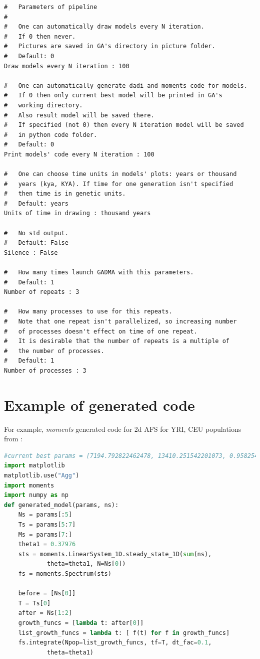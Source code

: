 \documentclass[12pt]{article}
\newcommand{\moments}{\textit{moments}\xspace}
\begin{document}
\begin{appendices}
\begin{lstlisting}
#   Parameters of pipeline
#
#   One can automatically draw models every N iteration. 
#   If 0 then never.
#   Pictures are saved in GA's directory in picture folder.
#   Default: 0
Draw models every N iteration : 100

#   One can automatically generate dadi and moments code for models.
#   If 0 then only current best model will be printed in GA's 
#   working directory.
#   Also result model will be saved there. 
#   If specified (not 0) then every N iteration model will be saved
#   in python code folder.
#   Default: 0
Print models' code every N iteration : 100

#   One can choose time units in models' plots: years or thousand 
#   years (kya, KYA). If time for one generation isn't specified 
#   then time is in genetic units.
#   Default: years
Units of time in drawing : thousand years

#   No std output.
#   Default: False
Silence : False

#   How many times launch GADMA with this parameters.
#   Default: 1
Number of repeats : 3

#   How many processes to use for this repeats.
#   Note that one repeat isn't parallelized, so increasing number
#   of processes doesn't effect on time of one repeat.
#   It is desirable that the number of repeats is a multiple of 
#   the number of processes.
#   Default: 1
Number of processes : 3
\end{lstlisting}

\section{Example of generated code}
\label{sec:ex-gen-code}
For example, \moments generated code for 2d AFS for YRI, CEU populations from \cite{gutenkunst2009}:

\begin{lstlisting}[language=Python]
#current best params = [7194.792822462478, 13410.251542201073, 0.9582544565961783, 13542.979276844108, 12114.968575519626, 2683.3787253409746, 846.6668954957415, 0.00014172779289593632, 0.00012195685425105608]
import matplotlib
matplotlib.use("Agg")
import moments
import numpy as np
def generated_model(params, ns):
	Ns = params[:5]
	Ts = params[5:7]
	Ms = params[7:]
	theta1 = 0.37976
	sts = moments.LinearSystem_1D.steady_state_1D(sum(ns), 
	        theta=theta1, N=Ns[0])
	fs = moments.Spectrum(sts)

	before = [Ns[0]]
	T = Ts[0]
	after = Ns[1:2]
	growth_funcs = [lambda t: after[0]]
	list_growth_funcs = lambda t: [ f(t) for f in growth_funcs]
	fs.integrate(Npop=list_growth_funcs, tf=T, dt_fac=0.1, 
	        theta=theta1)


\end{lstlisting}
\end{appendices}
\end{document}

